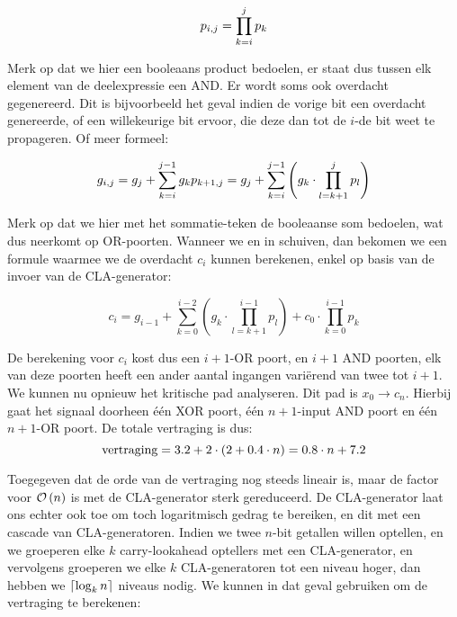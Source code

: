 \begin{equation}
p_{i,j}=\displaystyle\prod_{k=i}^j{p_k}
\eqnlab{cla-pij}
\end{equation}

Merk op dat we hier een booleaans product bedoelen, er staat dus tussen elk element van de deelexpressie een AND. Er wordt soms ook overdacht gegenereerd. Dit is bijvoorbeeld het geval indien de vorige bit een overdacht genereerde, of een willekeurige bit ervoor, die deze dan tot de $i$-de bit weet te propageren. Of meer formeel:

\begin{equation}
g_{i,j}=g_j+\displaystyle\sum_{k=i}^{j-1}{g_kp_{k+1,j}}=g_j+\displaystyle\sum_{k=i}^{j-1}{\brak{g_k\cdot\displaystyle\prod_{l=k+1}^j{p_l}}}
\eqnlab{cla-gij}
\end{equation}

Merk op dat we hier met het sommatie-teken de booleaanse som bedoelen, wat dus neerkomt op OR-poorten. Wanneer we  en  in  schuiven, dan bekomen we een formule waarmee we de overdacht $c_i$ kunnen berekenen, enkel op basis van de invoer van de CLA-generator:

\begin{equation}
c_i=g_{i-1}+\displaystyle\sum_{k=0}^{i-2}{\left(g_k\cdot\displaystyle\prod_{l=k+1}^{i-1}{p_l}\right)}+c_0\cdot\displaystyle\prod_{k=0}^{i-1}{p_k}
\end{equation}

De berekening voor $c_i$ kost dus een $i+1$-OR poort, en $i+1$ AND poorten, elk van deze poorten heeft een ander aantal ingangen vari\"erend van twee tot $i+1$. We kunnen nu opnieuw het kritische pad analyseren. Dit pad is $x_0\rightarrow c_n$. Hierbij gaat het signaal doorheen \'e\'en XOR poort, \'e\'en $n+1$-input AND poort en \'e\'en $n+1$-OR poort. De totale vertraging is dus:
\begin{equation}
\mbox{vertraging}=3.2+2\cdot\brak{2+0.4\cdot n}=0.8\cdot n+7.2
\eqnlab{delayCLAGenerator}
\end{equation}

Toegegeven dat de orde van de vertraging nog steeds lineair is, maar de factor voor $\mathcal{O}\left( n \right)$ is met de CLA-generator sterk gereduceerd. De CLA-generator laat ons echter ook toe om toch logaritmisch gedrag te bereiken, en dit met een cascade van CLA-generatoren. Indien we twee $n$-bit getallen willen optellen, en we groeperen elke $k$ carry-lookahead optellers met een CLA-generator, en vervolgens groeperen we elke $k$ CLA-generatoren tot een niveau hoger, dan hebben we $\left\lceil \log_kn \right\rceil$ niveaus nodig. We kunnen in dat geval  gebruiken om de vertraging te berekenen:

